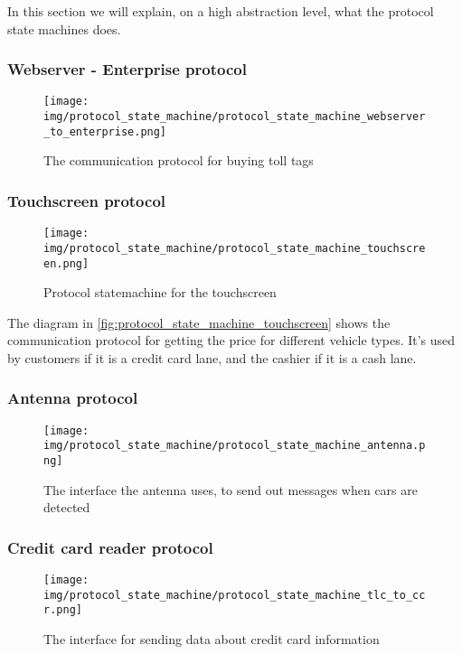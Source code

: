 In this section we will explain, on a high abstraction level, what the protocol state machines does.
\subsubsection*{Webserver - Enterprise protocol}
\begin{figure}
\centering
\texttt{[image: img/protocol\_state\_machine/protocol\_state\_machine\_webserver\_to\_enterprise.png]}
\caption{The communication protocol for buying toll tags}
\label{fig:protocol_state_machine_webserver_to_enterprise}
\end{figure}

\subsubsection*{Touchscreen protocol}
\begin{figure}
\centering
\texttt{[image: img/protocol\_state\_machine/protocol\_state\_machine\_touchscreen.png]}
\caption{Protocol statemachine for the touchscreen}
\label{fig:protocol_state_machine_touchscreen}
\end{figure}
The diagram in \autoref{fig:protocol_state_machine_touchscreen} shows the communication protocol for getting the price for different vehicle types. It's used by customers if it is a credit card lane, and the cashier if it is a cash lane.

\subsubsection*{Antenna protocol}
\begin{figure}
\centering
\texttt{[image: img/protocol\_state\_machine/protocol\_state\_machine\_antenna.png]}
\caption{The interface the antenna uses, to send out messages when cars are detected}
\label{fig:protocol_state_machine_antenna}
\end{figure}

\subsubsection*{Credit card reader protocol}
\begin{figure}
\centering
\texttt{[image: img/protocol\_state\_machine/protocol\_state\_machine\_tlc\_to\_ccr.png]}
\caption{The interface for sending data about credit card information}
\label{fig:protocol_state_machine_tlc_to_ccr}
\end{figure}

